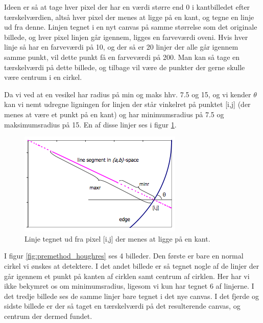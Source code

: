 Ideen er så at tage hver pixel der har en værdi større end 0 i kantbilledet efter tærskelværdien, altså hver pixel der menes at ligge på en kant, og tegne en linje ud fra denne. Linjen tegnet i en nyt canvas på samme størrelse som det originale billede, og hver pixel linjen går igennem, ligges en farveværdi oveni. Hvis hver linje så har en farveværdi på 10, og der så er 20 linjer der alle går igennem samme punkt, vil dette punkt få en farveværdi på 200. Man kan så tage en tærskelværdi på dette billede, og tilbage vil være de punkter der gerne skulle være centrum i en cirkel. 

Da vi ved at en vesikel har radius på min og maks hhv. 7.5 og 15, og vi kender $\theta$ kan vi nemt udregne ligningen for linjen der står vinkelret på punktet [i,j] (der menes at være et punkt på en kant) og har minimumsradius på 7.5 og maksimumsradius på 15. En af disse linjer ses i figur \ref{fig:premethod_houghLines}. 

\begin{figure}[H]
	\centering
	\includegraphics[scale=1]{files/premethod/img/hough_lines.png}
	\caption{Linje tegnet ud fra pixel [i,j] der menes at ligge på en kant.\label{fig:premethod_houghLines}}
\end{figure}

I figur \ref{fig:premethod_houghres} ses 4 billeder. Den første er bare en normal cirkel vi ønskes at detektere. I det andet billede er så tegnet nogle af de linjer der går igennem et punkt på kanten af cirklen samt centrum af cirklen. Her har vi ikke bekymret os om minimumsradius, ligesom vi kun har tegnet 6 af linjerne. I det tredje billede ses de samme linjer bare tegnet i det nye canvas. I det fjerde og sidste billede er der så taget en tærskelværdi på det resulterende canvas, og centrum der dermed fundet.

